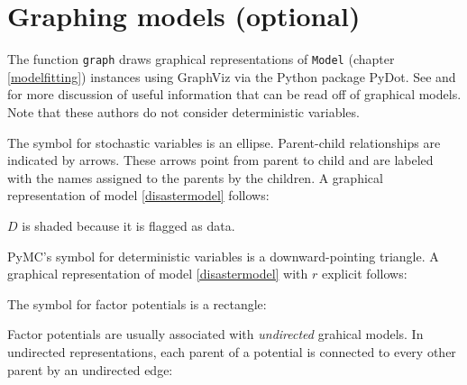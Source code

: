 \section{Graphing models (optional)}
\label{sec:graphical}

The function \texttt{graph} draws graphical representations of \texttt{Model} (chapter \ref{modelfitting}) instances using GraphViz via the Python package PyDot. See \cite{dawidmarkov} and \cite{jordangraphical} for more discussion of useful information that can be read off of graphical models. Note that these authors do not consider deterministic variables.

The symbol for stochastic variables is an ellipse. Parent-child relationships are indicated by arrows. These arrows point from parent to child and are labeled with the names assigned to the parents by the children. A graphical representation of model \ref{disastermodel} follows:
\begin{center}
\end{center} 
$D$ is shaded because it is flagged as data.

PyMC's symbol for deterministic variables is a downward-pointing triangle. A graphical representation of model \ref{disastermodel} with $r$ explicit follows:
\begin{center}
\end{center}

The symbol for factor potentials is a rectangle:
\begin{center}
\end{center}
Factor potentials are usually associated with \emph{undirected} grahical models. In undirected representations, each parent of a potential is connected to every other parent by an undirected edge:
\begin{center}
\end{center}

